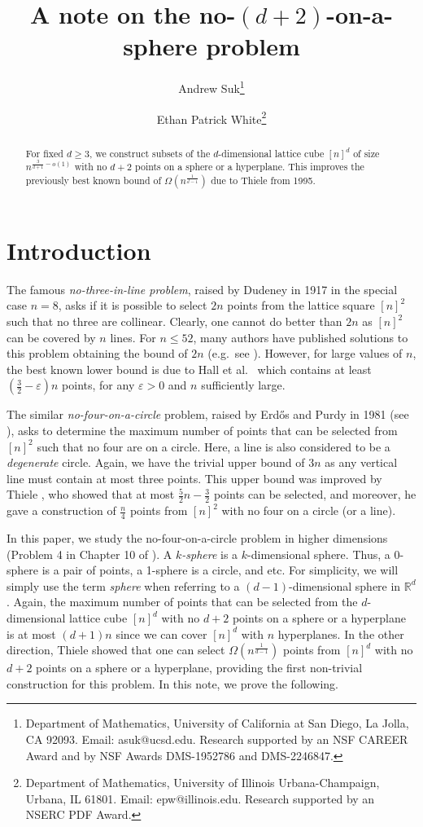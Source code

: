 \documentclass[11pt]{article}
\date{}
\title{A note on the no-$(d+2)$-on-a-sphere problem}
\author{Andrew Suk\thanks{Department of Mathematics, University of California at San Diego, La Jolla, CA 92093. Email: asuk@ucsd.edu. Research supported by an NSF
CAREER Award and by NSF Awards DMS-1952786 and DMS-2246847.} \and 
Ethan Patrick White\thanks{Department of Mathematics, University of Illinois Urbana-Champaign, Urbana, IL 61801. Email: epw@illinois.edu. Research supported by an NSERC PDF Award.}}
\date{}
\theoremstyle{plain}
\theoremstyle{definition}
\theoremstyle{remark}
\begin{document}
\maketitle




\begin{abstract} 

For fixed $d\geq 3$, we construct subsets of the $d$-dimensional lattice cube $[n]^d$ of size $n^{\frac{3}{d + 1} - o(1)}$ with no $d+2$ points on a sphere or a hyperplane.  This improves the previously best known bound of $\Omega(n^{\frac{1}{d-1}})$ due to Thiele from 1995.

 
\end{abstract}

\section{Introduction}


The famous \emph{no-three-in-line problem}, raised by Dudeney in 1917 in the special case $n = 8$, asks if it is possible to select $2n$ points from the lattice square $[n]^2$ such that no three are collinear.  Clearly, one cannot do better than $2n$ as $[n]^2$ can be covered by $n$ lines.  For $n\leq 52$, many authors have published solutions to this problem obtaining the bound of $2n$ (e.g.~see \cite{Fl}).  However, for large values of $n$, the best known lower bound is due to Hall et al.~\cite{Ha} which contains at least $\left(\frac{3}{2} - \varepsilon\right)n$ points, for any $\varepsilon > 0$ and $n$ sufficiently large.

The similar \emph{no-four-on-a-circle} problem, raised by Erd\H os and Purdy in 1981 (see \cite{RKG}), asks to determine the maximum number of points that can be selected from $[n]^2$ such that no four are on a circle.  Here, a line is also considered to be a \emph{degenerate} circle.  Again, we have the trivial upper bound of $3n$ as any vertical line must contain at most three points.  This upper bound was improved by Thiele \cite{thiele1}, who showed that at most $\frac{5}{2}n - \frac{3}{2}$ points can be selected, and moreover, he gave a construction of $\frac{n}{4}$ points from $[n]^2$ with no four on a circle (or  a line).  


In this paper, we study the no-four-on-a-circle problem in higher dimensions (Problem 4 in Chapter 10 of \cite{brass}).  A \emph{$k$-sphere} is a $k$-dimensional sphere.  Thus, a 0-sphere is a pair of points, a 1-sphere is a circle, and etc.  For simplicity, we will simply use the term \emph{sphere} when referring to a $(d-1)$-dimensional sphere in $\mathbb{R}^d$.  Again, the maximum number of points that can be selected from the $d$-dimensional lattice cube $[n]^d$ with no $d+2$ points on a sphere or a hyperplane is at most $(d+1)n$ since we can cover $[n]^d$ with $n$ hyperplanes.  In the other direction, Thiele \cite{thiele2} showed that one can select $\Omega(n^{\frac{1}{d-1}})$ points from $[n]^d$ with no $d+2$ points on a sphere or a hyperplane, providing the first non-trivial construction for this problem.  In this note, we prove the following.
 
\end{document}

